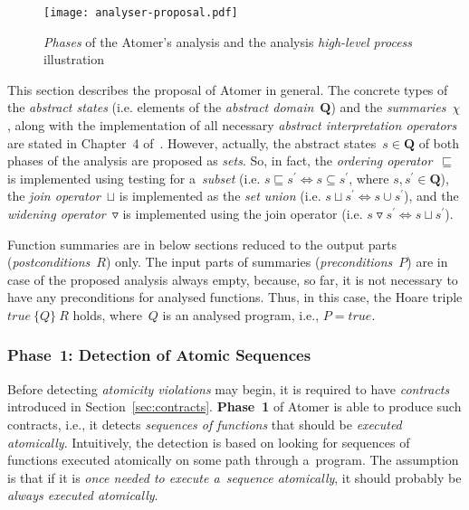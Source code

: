 \begin{figure}[hbt]
    \centering
    \texttt{[image: analyser-proposal.pdf]}
    \caption{%
        \emph{Phases} of the Atomer's analysis and the analysis
        \emph{high-level process} illustration%
    }
    \label{fig:atomerPhasesSequences}
\end{figure}

This section describes the proposal of Atomer in general. The concrete types
of the \emph{abstract states} (i.e. elements of the \emph{abstract
domain}~$ \boldsymbol{Q} $) and the \emph{summaries}~$ \chi $, along with the
implementation of all necessary \emph{abstract interpretation operators}
are stated in Chapter~4 of~\cite{harmimBP}. However, actually, the abstract
states~$ s \in \boldsymbol{Q} $ of both phases of the analysis are proposed as
\emph{sets}. So, in fact, the \emph{ordering operator}~$ \sqsubseteq $ is
implemented using testing for a~\emph{subset} (i.e. $ s \sqsubseteq s^\prime
\Leftrightarrow s \subseteq s^\prime $, where $ s, s^\prime \in
\boldsymbol{Q} $), the \emph{join operator}~$ \sqcup $ is implemented as the
\emph{set union} (i.e. $ s \sqcup s^\prime \Leftrightarrow s \cup s^\prime $),
and the \emph{widening operator}~$ \triangledown $ is implemented using the
join operator (i.e. $ s \triangledown s^\prime \Leftrightarrow s \sqcup
s^\prime $).

Function summaries are in below sections reduced to the output parts
(\emph{postconditions}~$ R $) only. The input parts of summaries
(\emph{preconditions}~$ P $) are in case of the proposed analysis always empty,
because, so far, it is not necessary to have any preconditions for analysed
functions. Thus, in this case, the Hoare triple ${ true\ \{Q\}\ R }$ holds,
where~$ Q $ is an analysed program, i.e., $ P = true $.

\subsubsection{Phase~1: Detection of Atomic Sequences}

Before detecting \emph{atomicity violations} may begin, it is required to have
\emph{contracts} introduced in Section~\ref{sec:contracts}. \textbf{Phase~1}
of Atomer is able to produce such contracts, i.e., it detects \emph{sequences
of functions} that should be \emph{executed atomically}. Intuitively, the
detection is based on looking for sequences of functions executed atomically
on some path through a~program. The assumption is that if it is \emph{once
needed to execute a~sequence atomically}, it should probably be \emph{always
executed atomically}.

